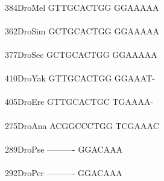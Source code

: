 \documentclass[11pt,twoside,reqno,a4paper]{article}
\begin{document}
{\\
384\hspace*{1\charwidth}DroMel	GTTGCACTGG	GGAAAAA\\
\hspace*{4\charwidth}\hspace*{7\charwidth}\hspace*{1\charwidth}\\
362\hspace*{1\charwidth}DroSim	GCTGCACTGG	GGAAAAA\\
\hspace*{4\charwidth}\hspace*{7\charwidth}\hspace*{1\charwidth}\\
377\hspace*{1\charwidth}DroSec	GCTGCACTGG	GGAAAAA\\
\hspace*{4\charwidth}\hspace*{7\charwidth}\hspace*{1\charwidth}\\
410\hspace*{1\charwidth}DroYak	GTTGCACTGG	GGAAAT-\\
\hspace*{4\charwidth}\hspace*{7\charwidth}\hspace*{1\charwidth}\\
405\hspace*{1\charwidth}DroEre	GTTGCACTGC	TGAAAA-\\
\hspace*{4\charwidth}\hspace*{7\charwidth}\hspace*{1\charwidth}\\
275\hspace*{1\charwidth}DroAna	ACGGCCCTGG	TCGAAAC\\
\hspace*{4\charwidth}\hspace*{7\charwidth}\hspace*{1\charwidth}\\
289\hspace*{1\charwidth}DroPse	----------	GGACAAA\\
\hspace*{4\charwidth}\hspace*{7\charwidth}\hspace*{1\charwidth}\\
292\hspace*{1\charwidth}DroPer	----------	GGACAAA\\
}
\end{document}
